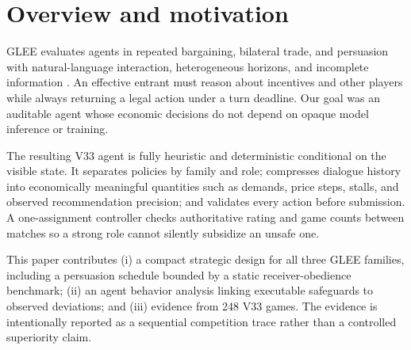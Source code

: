 \section{Overview and motivation}

GLEE evaluates agents in repeated bargaining, bilateral trade, and persuasion
with natural-language interaction, heterogeneous horizons, and incomplete
information \citep{shapira2024glee}. An effective entrant must reason about
incentives and other players while always returning a legal action under a turn
deadline. Our goal was an auditable agent whose economic decisions do not
depend on opaque model inference or training.

The resulting V33 agent is fully heuristic and deterministic conditional on the
visible state. It separates policies by family and role; compresses dialogue
history into economically meaningful quantities such as demands, price steps,
stalls, and observed recommendation precision; and validates every action
before submission. A one-assignment controller checks authoritative rating and
game counts between matches so a strong role cannot silently subsidize an
unsafe one.

This paper contributes (i) a compact strategic design for all three GLEE
families, including a persuasion schedule bounded by a static receiver-obedience
benchmark; (ii) an agent
behavior analysis linking executable safeguards to observed deviations; and
(iii) evidence from 248 V33 games. The evidence is intentionally reported as a
sequential competition trace rather than a controlled superiority claim.
